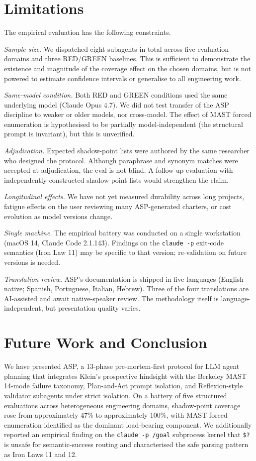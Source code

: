 \documentclass[11pt, a4paper]{article}
\begin{document}
\section{Limitations}
\label{sec:limitations}

The empirical evaluation has the following constraints.

\textit{Sample size.} We dispatched eight subagents in total across five evaluation domains and three RED/GREEN baselines. This is sufficient to demonstrate the existence and magnitude of the coverage effect on the chosen domains, but is not powered to estimate confidence intervals or generalise to all engineering work.

\textit{Same-model condition.} Both RED and GREEN conditions used the same underlying model (Claude Opus 4.7). We did not test transfer of the ASP discipline to weaker or older models, nor cross-model. The effect of MAST forced enumeration is hypothesised to be partially model-independent (the structural prompt is invariant), but this is unverified.

\textit{Adjudication.} Expected shadow-point lists were authored by the same researcher who designed the protocol. Although paraphrase and synonym matches were accepted at adjudication, the eval is not blind. A follow-up evaluation with independently-constructed shadow-point lists would strengthen the claim.

\textit{Longitudinal effects.} We have not yet measured durability across long projects, fatigue effects on the user reviewing many ASP-generated charters, or cost evolution as model versions change.

\textit{Single machine.} The empirical battery was conducted on a single workstation (macOS 14, Claude Code 2.1.143). Findings on the \texttt{claude -p} exit-code semantics (Iron Law 11) may be specific to that version; re-validation on future versions is needed.

\textit{Translation review.} ASP's documentation is shipped in five languages (English native; Spanish, Portuguese, Italian, Hebrew). Three of the four translations are AI-assisted and await native-speaker review. The methodology itself is language-independent, but presentation quality varies.

\section{Future Work and Conclusion}
\label{sec:conclusion}

We have presented ASP, a 13-phase pre-mortem-first protocol for LLM agent planning that integrates Klein's prospective hindsight with the Berkeley MAST 14-mode failure taxonomy, Plan-and-Act prompt isolation, and Reflexion-style validator subagents under strict isolation. On a battery of five structured evaluations across heterogeneous engineering domains, shadow-point coverage rose from approximately 47\% to approximately 100\%, with MAST forced enumeration identified as the dominant load-bearing component. We additionally reported an empirical finding on the \texttt{claude -p /goal} subprocess kernel that \texttt{\$?} is unsafe for semantic-success routing and characterised the safe parsing pattern as Iron Laws 11 and 12.
\end{document}
